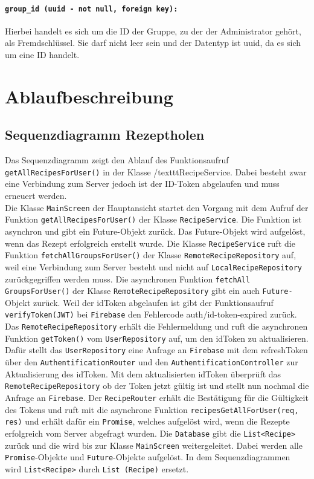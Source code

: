 \documentclass{entwurfsheft}
\begin{document}
\paragraph{\texttt{group\_id (uuid - not null, foreign key):}} Hierbei handelt es sich um die ID der Gruppe, zu der der Administrator gehört, als Fremdschlüssel. Sie darf nicht leer sein und der Datentyp ist \Gls{uuid}, da es sich um eine ID handelt.
\newpage

\section{Ablaufbeschreibung}
    \subsection{Sequenzdiagramm Rezeptholen}
            Das Sequenzdiagramm zeigt den Ablauf des Funktionsaufruf \texttt{getAllRecipesForUser()} in der Klasse /texttt{RecipeService}. Dabei besteht zwar eine Verbindung zum Server jedoch ist der ID-Token abgelaufen und muss erneuert werden.\\
            Die Klasse \texttt{MainScreen} der Hauptansicht startet den Vorgang mit dem Aufruf der Funktion \texttt{getAllRecipesForUser()} der Klasse \texttt{RecipeService}. Die Funktion ist asynchron und gibt ein Future-Objekt zurück. Das Future-Objekt wird aufgelöst, wenn das Rezept erfolgreich erstellt wurde. Die Klasse \texttt{RecipeService} ruft die Funktion \texttt{fetchAllGroupsForUser()} der Klasse \texttt{RemoteRecipeRepository} auf, weil eine Verbindung zum Server besteht und nicht auf \texttt{LocalRecipeRepository} zurückgegriffen werden muss. Die asynchronen Funktion \texttt{fetchAll GroupsForUser()} der Klasse \texttt{RemoteRecipeRepository} gibt ein auch \texttt{Future-}Objekt zurück. Weil der idToken abgelaufen ist gibt der Funktionsaufruf \texttt{verifyToken(JWT)} bei \texttt{Firebase} den Fehlercode auth\slash id-token-expired zurück. Das \texttt{RemoteRecipeRepository} erhält die Fehlermeldung und ruft die asynchronen Funktion \texttt{getToken()} vom \texttt{UserRepository} auf, um den idToken zu aktualisieren. Dafür stellt das \texttt{UserRepository} eine Anfrage an \texttt{Firebase} mit dem refreshToken über den \texttt{AuthentificationRouter} und den \texttt{AuthentificationController} zur Aktualisierung des idToken. Mit dem aktualisierten idToken überprüft das \texttt{RemoteRecipeRepository} ob der Token jetzt gültig ist und stellt nun nochmal die Anfrage an \texttt{Firebase}. Der \texttt{RecipeRouter} erhält die Bestätigung für die Gültigkeit des Tokens und ruft mit die asynchrone Funktion \texttt{recipesGetAllForUser(req, res)} und erhält dafür ein \texttt{Promise}, welches aufgelöst wird, wenn die Rezepte erfolgreich vom Server abgefragt wurden. Die \texttt{Database} gibt die \texttt{List<Recipe>} zurück und die wird bis zur Klasse \texttt{MainScreen} weitergeleitet. Dabei werden alle \texttt{Promise}-Objekte und \texttt{Future}-Objekte aufgelöst. In dem Sequenzdiagrammen wird \texttt{List<Recipe>} durch \texttt{List (Recipe)} ersetzt.
    \newpage
        
\end{document}
